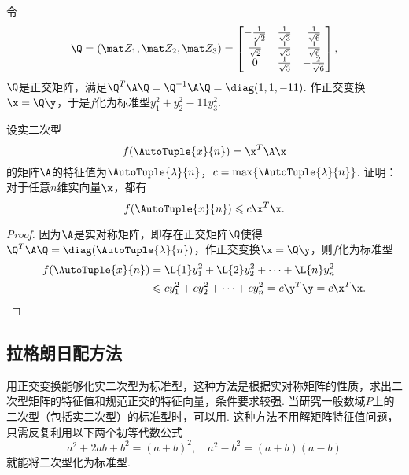 \begin{example}
\begin{solution}
令\[
\Q = (\z_1,\z_2,\z_3) = \begin{bmatrix}
-\frac{1}{\sqrt{2}} & \frac{1}{\sqrt{3}} & \frac{1}{\sqrt{6}} \\
\frac{1}{\sqrt{2}} & \frac{1}{\sqrt{3}} & \frac{1}{\sqrt{6}} \\
0 & \frac{1}{\sqrt{3}} & -\frac{2}{\sqrt{6}} \\
\end{bmatrix},
\]\(\Q\)是正交矩阵，满足\(\Q^T\A\Q=\Q^{-1}\A\Q=\diag(1,1,-11)\).
作正交变换\(\x=\Q\y\)，于是\(f\)化为标准型\(y_1^2+y_2^2-11y_3^2\).
\end{solution}
\end{example}

\begin{example}
设实二次型\[
f(\AutoTuple{x}{n})=\x^T\A\x
\]的矩阵\(\A\)的特征值为\(\AutoTuple{\lambda}{n}\)，\(c=\max\{\AutoTuple{\lambda}{n}\}\).
证明：对于任意\(n\)维实向量\(\x\)，都有\[
f(\AutoTuple{x}{n}) \leqslant c \x^T\x.
\]
\begin{proof}
因为\(\A\)是实对称矩阵，即存在正交矩阵\(\Q\)使得\(\Q^T\A\Q = \diag(\AutoTuple{\lambda}{n})\)，作正交变换\(\x=\Q\y\)，则\(f\)化为标准型\begin{align*}
f(\AutoTuple{x}{n}) &= \L{1} y_1^2 + \L{2} y_2^2 + \dotsb + \L{n} y_n^2 \\
&\leqslant c y_1^2 + c y_2^2 + \dotsb + c y_n^2
= c \y^T \y = c \x^T \x.
\qedhere
\end{align*}
\end{proof}
\end{example}

\subsection{拉格朗日配方法}
用正交变换能够化实二次型为标准型，这种方法是根据实对称矩阵的性质，求出二次型矩阵的特征值和规范正交的特征向量，条件要求较强.
当研究一般数域\(P\)上的二次型（包括实二次型）的标准型时，可以用.
这种方法不用解矩阵特征值问题，只需反复利用以下两个初等代数公式\[
a^2+2ab+b^2=(a+b)^2 ,\quad a^2-b^2=(a+b)(a-b)
\]就能将二次型化为标准型.

